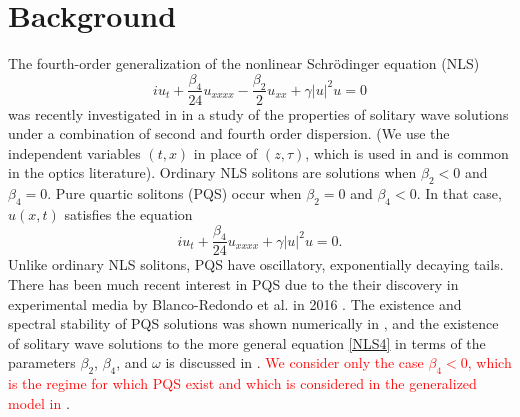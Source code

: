 \documentclass[12pt]{elsarticle}
\newcommand{\revised}[1]{ \textcolor{red}{#1} }
\begin{document}
\section{Background}

The fourth-order generalization of the nonlinear Schr{\"o}dinger equation (NLS)
\begin{equation}\label{NLS4}
i u_t + \frac{\beta_4}{24}u_{xxxx} - \frac{\beta_2}{2}u_{xx} + \gamma |u|^2 u = 0
\end{equation}
was recently investigated in \cite{Tam2020} in a study of the properties of solitary wave solutions under a combination of second and fourth order dispersion. (We use the independent variables $(t, x)$ in place of $(z, \tau)$, which is used in \cite{BlancoPQS,Tam2019,Tam2020} and is common in the optics literature). Ordinary NLS solitons are solutions when $\beta_2 < 0$ and $\beta_4 = 0$. Pure quartic solitons (PQS) occur when $\beta_2 = 0$ and $\beta_4 < 0$. In that case, $u(x,t)$ satisfies the equation
\begin{equation}\label{PQSeq}
i u_t + \frac{\beta_4}{24}u_{xxxx} + \gamma |u|^2 u = 0.
\end{equation}
Unlike ordinary NLS solitons, PQS have oscillatory, exponentially decaying tails. There has been much recent interest in PQS due to the their discovery in experimental media by Blanco-Redondo et al. in 2016 \cite{BlancoPQS}. The existence and spectral stability of PQS solutions was shown numerically in \cite{Tam2019}, and the existence of solitary wave solutions to the more general equation \cref{NLS4} in terms of the parameters $\beta_2$, $\beta_4$, and $\omega$ is discussed in \cite{Tam2020}. \revised{We consider only the case $\beta_4 < 0$, which is the regime for which PQS exist \cite{Tam2019} and which is considered in the generalized model in \cite{Tam2020}}.
\end{document}
